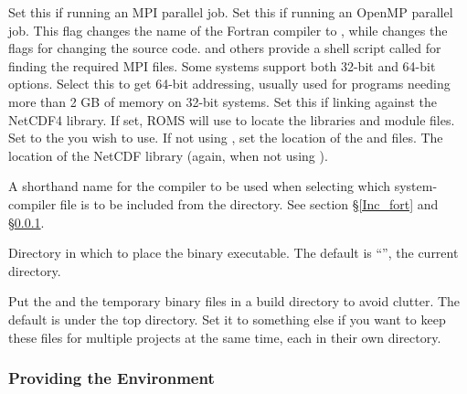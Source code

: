 \begin{klist}
\begin{klist}
   Set this if running an MPI parallel job.
   Set this if running an OpenMP parallel job.
   This flag changes the name of the
  Fortran compiler to , while
   changes the  flags
  for changing the source code.  and others
  provide a shell script called  for finding the required MPI
  files.
    Some systems support both 32-bit and 64-bit
  options. Select this to get 64-bit addressing, usually used for
  programs needing more than 2 GB of memory on 32-bit systems.
   Set this if linking against the NetCDF4
  library. If set, ROMS will use  to locate the
  libraries and module files.
   Set to the  you wish to use.
   If not using , set the
  location of the  and  files.
   The location of the NetCDF library (again,
  when not using ).
\end{klist}

 A shorthand name for the compiler to be used when
selecting which system-compiler file is to be included from the
 directory. See section \S\ref{Inc_fort} and
\S\ref{make_env}.

\begin{klist}
   Directory in which to place the binary executable.
The default is ``'', the current directory.

   Put the  and the temporary binary files
in a build directory to avoid clutter. The default is 
under the top directory. Set it to something else if you want
to keep these files for multiple projects at the same time, each in
their own directory.
\end{klist}
\end{klist}

\subsubsection{Providing the Environment}
\label{make_env}

